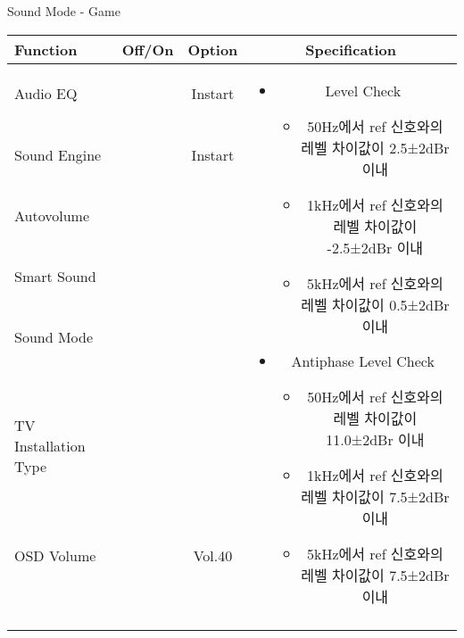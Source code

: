 \begin{frame}[t]{Sound Mode - Game}
\begin{tiny}
\begin{tabular}{@{}lccc@{}}
\toprule
Function & Off/On & Option & Specification \\
\midrule
Audio EQ & \color{black}{Off} & Instart &
\multirow{10}{60mm}{
\begin{itemize}
    \item Level Check
    \begin{itemize}
        \item 50Hz에서 ref 신호와의 레벨 차이값이 2.5±2dBr 이내
        \item 1kHz에서 ref 신호와의 레벨 차이값이 -2.5±2dBr 이내
        \item 5kHz에서 ref 신호와의 레벨 차이값이 0.5±2dBr 이내
    \end{itemize}
    \item Antiphase Level Check
    \begin{itemize}
        \item 50Hz에서 ref 신호와의 레벨 차이값이 11.0±2dBr 이내
        \item 1kHz에서 ref 신호와의 레벨 차이값이 7.5±2dBr 이내
        \item 5kHz에서 ref 신호와의 레벨 차이값이 7.5±2dBr 이내
    \end{itemize}
\end{itemize}
} \\
Sound Engine & \color{blue}{On} & Instart & \\
Autovolume & \color{black}{Off} & & \\
Smart Sound & \color{black}{Off} & & \\
Sound Mode & \color{blue}{On} & \color{blue}{Game} & \\
TV Installation Type & \color{blue}{On} & \color{black}{Standtype1} & \\
OSD Volume & \color{blue}{On} & Vol.40 & \\
& & & \\
& & & \\
& & & \\
& & & \\
\midrule
\end{tabular}
\end{tiny}

\end{frame}
